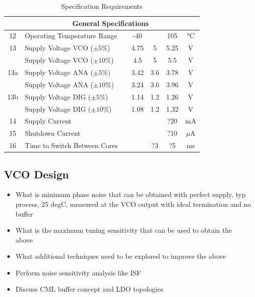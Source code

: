 \begin{table}[ht]
\begin{tabular}{|c|l|c|c|c|c|c|}
		& \multicolumn{6}{c|}{\textbf{General Specifications}} \\
		\hline
		12 & Operating Temperature Range &  & -40 &  & 105 & °C  \\ 
		\hline
		13 & Supply Voltage VCO ($\pm 5\%$) &  & 4.75 & 5 & 5.25 & V  \\ 
		 & Supply Voltage VCO ($\pm 10\%$) &  & 4.5 & 5 & 5.5 & V  \\ 
		\hline
		13a & Supply Voltage ANA ($\pm 5\%$) &  & 3.42 & 3.6 & 3.78 & V  \\ 
		 & Supply Voltage ANA ($\pm 10\%$) &  & 3.24 & 3.6 & 3.96 & V  \\ 
		\hline
		13b & Supply Voltage DIG ($\pm 5\%$) &  & 1.14 & 1.2 & 1.26 & V  \\ 
		 & Supply Voltage DIG ($\pm 10\%$) &  & 1.08 & 1.2 & 1.32 & V  \\ 
		\hline
		14 & Supply Current &  &  &  & ?20 & mA  \\ 
		\hline
		15 & Shutdown Current &  &  &  & ?10 & $\mu$A  \\ 
		\hline
		16 & Time to Switch Between Cores  &  &  & ?3 & ?5 & ms  \\ 
		\hline
	\end{tabular}
	\label{table-spec-ultra-low-noise}
	\caption{Specification Requirements} 

\end{table}


\subsection{VCO Design}

\begin{itemize}

	\item What is minimum phase noise that can be obtained with perfect supply, typ process, 25 degC, measured at the VCO output with ideal termination and no buffer
	\item What is the maximum  tuning sensitivity that can be used to obtain the above
	\item What additional techniques need to be explored to improve the above
	\item Perform noise sensitivity analysis like ISF
	\item Discuss CML buffer concept and LDO topologies %
	
\end{itemize}

